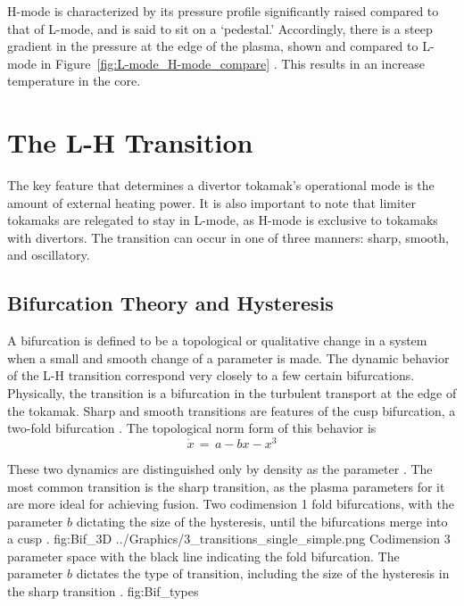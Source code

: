 H-mode is characterized by its pressure profile significantly raised compared to that of L-mode, and is said to sit on a `pedestal.'
Accordingly, there is a steep gradient in the pressure at the edge of the plasma, shown and compared to L-mode in Figure~\ref{fig:L-mode_H-mode_compare} \cite{weymiens_bifurcation_2014}.
This results in an increase temperature in the core.

\section{The L-H Transition}
The key feature that determines a divertor tokamak's operational mode is the amount of external heating power.
It is also important to note that limiter tokamaks are relegated to stay in L-mode, as H-mode is exclusive to tokamaks with divertors.
The transition can occur in one of three manners: sharp, smooth, and oscillatory.

\subsection{Bifurcation Theory and Hysteresis}
A bifurcation is defined to be a topological or qualitative change in a system when a small and smooth change of a parameter is made.
The dynamic behavior of the L-H transition correspond very closely to a few certain bifurcations.
Physically, the transition is a bifurcation in the turbulent transport at the edge of the tokamak.
Sharp and smooth transitions are features of the cusp bifurcation, a two-fold bifurcation \cite{weymiens_bifurcation_2014}. 
The topological norm form of this behavior is
\begin{equation}
	\dot{x} \,=\, a - bx - x^3
	\label{eq:sharp_bif}
\end{equation}

These two dynamics are distinguished only by density as the parameter .
The most common transition is the sharp transition, as the plasma parameters for it are more ideal for achieving fusion.
	{Two codimension 1 fold bifurcations, with the parameter $b$ dictating the size of the hysteresis, until the bifurcations merge into a cusp \cite{weymiens_bifurcation_2014}.}
	{fig:Bif_3D}
	{../Graphics/3_transitions_single_simple.png}
	{Codimension 3 parameter space with the black line indicating the fold bifurcation. The parameter $b$ dictates the type of transition, including the size of the hysteresis in the sharp transition \cite{weymiens_bifurcation_2014}.}
	{fig:Bif_types}

